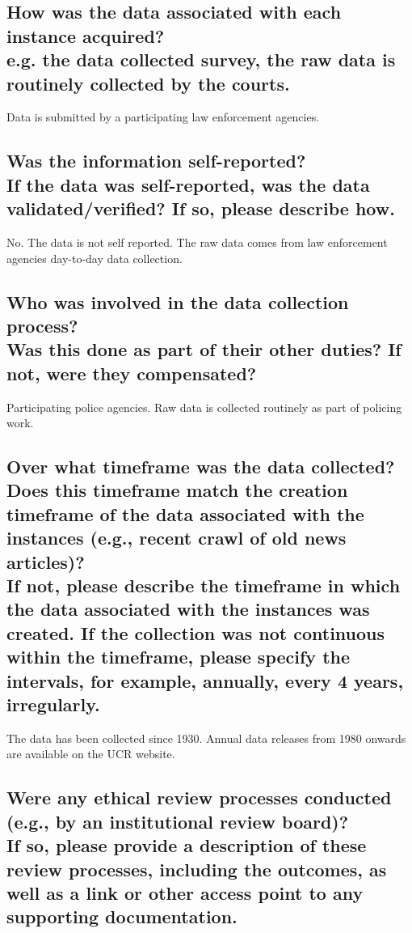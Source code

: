 \documentclass[letterpaper, 10 pt, conference]{ieeeconf}  %
\newcommand{\subtitle}[1]{{\\ \small \normalfont \color{purple} #1}}
\begin{document}
\subsection{How was the data associated with each instance acquired? \subtitle {e.g. the data collected survey, the raw data is routinely collected by the courts.}}

Data is submitted by a participating law enforcement agencies.

\subsection{Was the information self-reported? \subtitle{If the data was self-reported, was the data validated/verified? If so, please describe how.}}

No. The data is not self reported. The raw data comes from law enforcement agencies day-to-day data collection. 

\subsection{Who was involved in the data collection process? \subtitle{Was this done as part of their other duties? If not, were they compensated?}}
 

Participating police agencies. Raw data is collected routinely as part of policing work. 

\subsection{Over what timeframe was the data collected? Does this timeframe match the creation timeframe of the data associated with the instances (e.g., recent crawl of old news articles)? \subtitle{If not, please describe the timeframe in which the data associated with the instances was created. If the collection was not continuous within the timeframe, please specify the intervals, for example, annually, every 4 years, irregularly.}}


The data has been collected since 1930. Annual data releases from 1980 onwards are available on the UCR website.

\subsection{Were any ethical review processes conducted (e.g., by an institutional review board)? \subtitle{If so, please provide a description of these review processes, including the outcomes, as well as a link or other access point to any supporting documentation.}}
\end{document}
